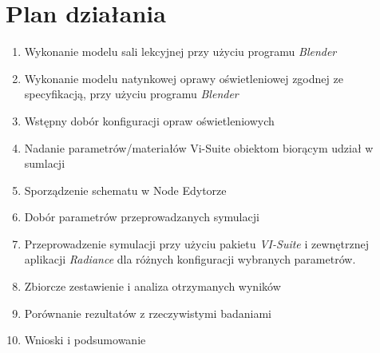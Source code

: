 \documentclass[a4paper,12pt]{article}
\begin{document}
	\section{Plan działania}
	\label{sec:plan_dzialania}
	\begin{enumerate}
		\item Wykonanie modelu sali lekcyjnej przy użyciu programu \emph{Blender} \checkmark
		\item Wykonanie modelu natynkowej oprawy oświetleniowej zgodnej ze specyfikacją, przy użyciu programu \emph{Blender} \checkmark
		\item Wstępny dobór konfiguracji opraw oświetleniowych \checkmark
		\item Nadanie parametrów/materiałów Vi-Suite obiektom biorącym udział w sumlacji \checkmark
		\item Sporządzenie schematu w Node Edytorze \checkmark
		\item Dobór parametrów przeprowadzanych symulacji \checkmark
		\item Przeprowadzenie symulacji przy użyciu pakietu \emph{VI-Suite} i zewnętrznej aplikacji \emph{Radiance} dla różnych konfiguracji wybranych parametrów. \checkmark
		\item Zbiorcze zestawienie i analiza otrzymanych wyników \checkmark
		\item Porównanie rezultatów z rzeczywistymi badaniami \checkmark
		\item Wnioski i podsumowanie \checkmark
		
	\end{enumerate}
	
\end{document}
